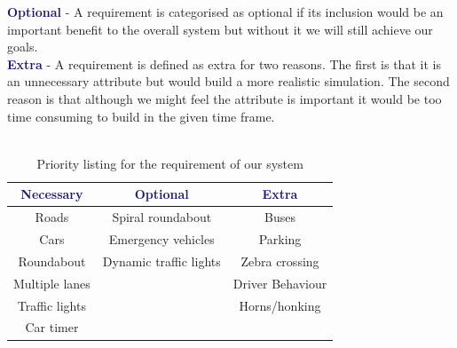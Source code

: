 \documentclass{article}
\begin{document}
	\noindent
	\textcolor{MidnightBlue}{\bf Optional} - A requirement is categorised as optional if its inclusion would be an important benefit to the overall system but without it we will still achieve our goals.\\
	
	\noindent
	\textcolor{MidnightBlue}{\bf Extra} - A requirement is defined as extra for two reasons. 
	The first is that it is an unnecessary attribute but would build a more realistic simulation. 
	The second reason is that although we might feel the attribute is important it would be too time consuming to build in the given time frame.\\\\
	
	
	
	
	\begin{table}[H] 
		\centering
		\label{PriorityListing}
		\begin{tabular}{|c|c|c|}
			\hline \rule{0pt}{2.5ex}
			\textcolor{MidnightBlue}{\bf Necessary}      & \textcolor{MidnightBlue}{\bf Optional} & \textcolor{MidnightBlue}{\bf Extra}   \\ \hline \rule{0pt}{2.5ex}
			Roads & Spiral roundabout & Buses  \\ 
			Cars & Emergency vehicles & Parking \\ 
			Roundabout & Dynamic traffic lights & Zebra crossing \\ 
			Multiple lanes & & Driver Behaviour  \\
			Traffic lights & & Horns/honking \\
			Car timer  & & \\ \hline 
		\end{tabular}
		\caption{Priority listing for the requirement of our system}
		\label{requirements}
		
	\end{table}
	
\end{document}

